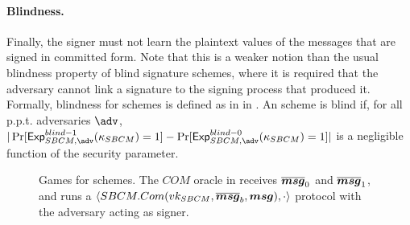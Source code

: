 \paragraph{Blindness.} %
Finally, the signer must not learn the plaintext values of the messages that are
signed in committed form. Note that this is a weaker notion than the usual
blindness property of blind signature schemes, where it is required that the
adversary cannot link a signature to the signing process that produced it.
Formally, blindness for \SBCM schemes is defined as in \ExpSBCMBlindb in
. An \SBCM scheme is blind if, for all p.p.t.
adversaries $\adv$, $|\Pr[\ExpSBCMBlindo(\SBCMsecpar) = 1] -
\Pr[\ExpSBCMBlindz(\SBCMsecpar) = 1]|$ is a negligible function of the security
parameter.

\begin{figure}[ht!]
  \label{fig:sbcm-games}
  \caption{Games for \SBCM schemes. The $COM$ oracle in \ExpSBCMBlindb receives
    $\overline{\boldsymbol{msg}}_0$ and $\overline{\boldsymbol{msg}}_1$, and runs a $\langle
    SBCM.Com(vk_{SBCM},\overline{\boldsymbol{msg}}_b,\boldsymbol{msg}),\cdot\rangle$ protocol with the
    adversary acting as signer.}
\end{figure}

